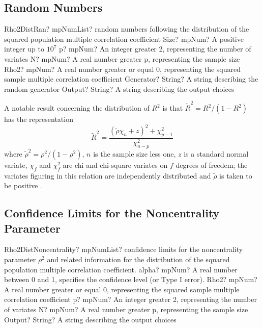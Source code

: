 \subsection{Random Numbers}

\begin{mpFunctionsExtract}
	\mpFunctionSixNotImplemented
	{Rho2DistRan? mpNumList? random numbers following the distribution of the squared population multiple correlation coefficient}
	{Size? mpNum? A positive integer up to $10^7$}
	{p? mpNum? An integer greater 2, representing the number of variates}
	{N? mpNum? A real number greater p, representing the sample size}
	{Rho2? mpNum? A real number greater or equal 0, representing the squared sample multiple correlation coefficient}
	{Generator? String? A string describing the random generator}
	{Output? String? A string describing the output choices}
\end{mpFunctionsExtract}


\vspace{0.3cm}


A notable result concerning the distribution of $R^2$ is that $\tilde{R}^2 = R^2/(1-R^2)$ has the representation
\begin{equation}
	\tilde{R}^2 = \frac{(\tilde{\rho}\chi_n + z)^2 + \chi_{p-1}^2}{\chi_{n-p}^2} \label{eq:Rho2DistRandom}
\end{equation}
where $\tilde{\rho}^2 = \rho^2/(1-\rho^2)$, $n$ is the sample size less one, $z$ is a standard normal variate, $\chi_f$ and $\chi_f^2$ are chi and chi-square variates on $f$ degrees of freedem; 
the variates figuring in this relation are independently distributed and $\tilde{\rho}$ is taken to be positive \cite{lee_results_1971}.





\subsection{Confidence Limits for the Noncentrality Parameter}
\label{Rho2Noncentrality}

\begin{mpFunctionsExtract}
	\mpFunctionFiveNotImplemented
	{Rho2DistNoncentrality? mpNumList? confidence limits for the noncentrality parameter $\rho^2$ and related information for the distribution of the squared population multiple correlation coefficient.}
	{alpha? mpNum? A real number between 0 and 1, specifies the confidence level (or Type I error).}
	{Rho2? mpNum? A real number greater or equal 0, representing the squared sample multiple correlation coefficient}
	{p? mpNum? An integer greater 2, representing the number of variates}
	{N? mpNum? A real number greater p, representing the sample size}
	{Output? String? A string describing the output choices}
\end{mpFunctionsExtract}


